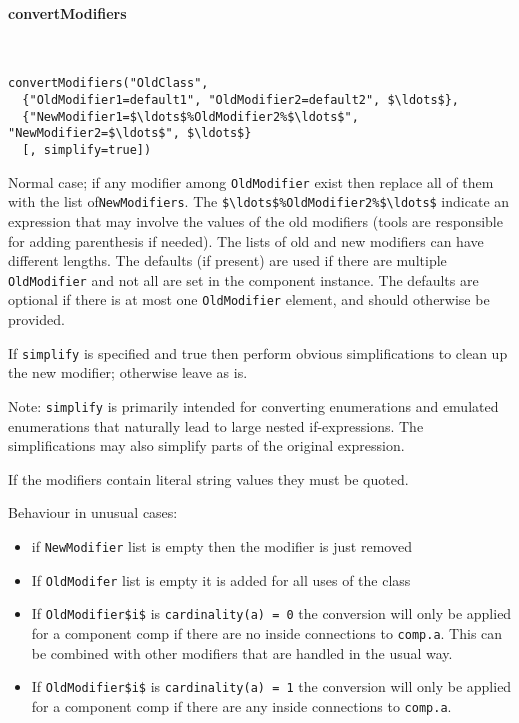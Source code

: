 \paragraph*{convertModifiers}\label{convertmodifiers}
\ %

\begin{lstlisting}[language=modelica]
convertModifiers("OldClass",
  {"OldModifier1=default1", "OldModifier2=default2", $\ldots$},
  {"NewModifier1=$\ldots$%OldModifier2%$\ldots$", "NewModifier2=$\ldots$", $\ldots$}
  [, simplify=true])
\end{lstlisting}

Normal case; if any modifier among \lstinline!OldModifier! exist then replace all of them with the list of\linebreak[4] \lstinline!NewModifiers!.
The \lstinline!$\ldots$%OldModifier2%$\ldots$! indicate an expression that may involve the values of the old modifiers (tools are responsible for adding parenthesis if needed).
The lists of old and new modifiers can have different lengths.
The defaults (if present) are used if there are multiple \lstinline!OldModifier! and not all are set in the component instance.
The defaults are optional if there is at most one \lstinline!OldModifier! element, and should otherwise be provided.

If \lstinline!simplify! is specified and true then perform obvious simplifications
to clean up the new modifier; otherwise leave as is.

\begin{nonnormative}
Note: \lstinline!simplify! is primarily intended for converting enumerations and emulated
enumerations that naturally lead to large nested if-expressions. The
simplifications may also simplify parts of the original expression.
\end{nonnormative}

If the modifiers contain literal string values they must be quoted.

Behaviour in unusual cases:
\begin{itemize}
\item
  if \lstinline!NewModifier! list is empty then the modifier is just removed
\item
  If \lstinline!OldModifer! list is empty it is added for all uses of the class
\item
  If \lstinline!OldModifier$i$! is \lstinline!cardinality(a) = 0! the conversion will only be applied for a component comp if there are no inside connections to \lstinline!comp.a!. This can be combined with other modifiers that are handled in the usual way.
\item
  If \lstinline!OldModifier$i$! is \lstinline!cardinality(a) = 1! the conversion will only be applied for a component comp if there are any inside connections to \lstinline!comp.a!.
\end{itemize}

